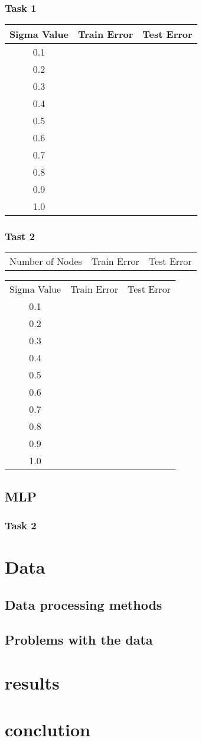 \documentclass{IEEEtran}
\begin{document}
\subsubsection{Task 1}
\begin{center}
\begin{tabular}{||c c c||}
  \hline
Sigma Value & Train Error & Test Error \\ [0.5ex]
\hline
0.1 \\
0.2 \\
0.3 \\
0.4 \\
0.5 \\
0.6 \\
0.7 \\
0.8 \\
0.9 \\
1.0 \\
\end{tabular}
\end{center}
\subsubsection{Tast 2}
\begin{center}
\begin{tabular}{||c c c||}
  \hline
Number of Nodes & Train Error & Test Error \\ [0.5ex]
\end{tabular}
\end{center}
\begin{center}
\begin{tabular}{||c c c||}
  \hline
Sigma Value & Train Error & Test Error \\ [0.5ex]
0.1 \\
0.2 \\
0.3 \\
0.4 \\
0.5 \\
0.6 \\
0.7 \\
0.8 \\
0.9 \\
1.0 \\
\end{tabular}
\end{center}
\subsection{MLP}
\subsubsection{Task 2}
\section{Data}
\subsection{Data processing methods}
\subsection{Problems with the data}
\section{results}
\section{conclution}
\end{document}
